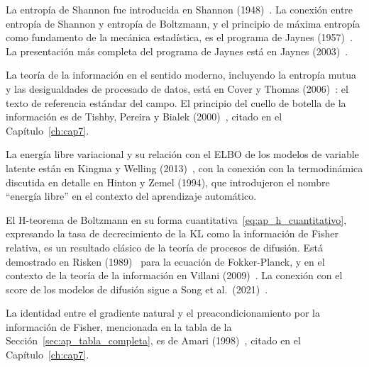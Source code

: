 \begin{notasbib}
La entropía de Shannon fue introducida en Shannon (1948)~\cite{shannon1948mathematical}.
La conexión entre entropía de Shannon y entropía de Boltzmann, y el principio de
máxima entropía como fundamento de la mecánica estadística, es el programa de
Jaynes (1957)~\cite{jaynes1957information}. La presentación más completa del
programa de Jaynes está en Jaynes (2003)~\cite{jaynes2003probability}.

La teoría de la información en el sentido moderno, incluyendo la entropía mutua
y las desigualdades de procesado de datos, está en Cover y Thomas
(2006)~\cite{cover2006elements}: el texto de referencia estándar del campo. El
principio del cuello de botella de la información es de Tishby, Pereira y Bialek
(2000)~\cite{tishby2000information}, citado en el Capítulo~\ref{ch:cap7}.

La energía libre variacional y su relación con el ELBO de los modelos de variable
latente están en Kingma y Welling (2013)~\cite{kingma2013auto}, con la conexión
con la termodinámica discutida en detalle en Hinton y Zemel (1994), que
introdujeron el nombre ``energía libre'' en el contexto del aprendizaje
automático.

El H-teorema de Boltzmann en su forma cuantitativa~\eqref{eq:ap_h_cuantitativo},
expresando la tasa de decrecimiento de la KL como la información de Fisher
relativa, es un resultado clásico de la teoría de procesos de difusión. Está
demostrado en Risken (1989)~\cite{risken1989fokker} para la ecuación de
Fokker-Planck, y en el contexto de la teoría de la información en
Villani (2009)~\cite{villani2009optimal}. La conexión con el score de los
modelos de difusión sigue a Song et al.\ (2021)~\cite{song2021score}.

La identidad entre el gradiente natural y el preacondicionamiento por la
información de Fisher, mencionada en la tabla de la Sección~\ref{sec:ap_tabla_completa},
es de Amari (1998)~\cite{amari1998natural}, citado en el Capítulo~\ref{ch:cap7}.
\end{notasbib}

\printbibliography[heading=subbibliography]